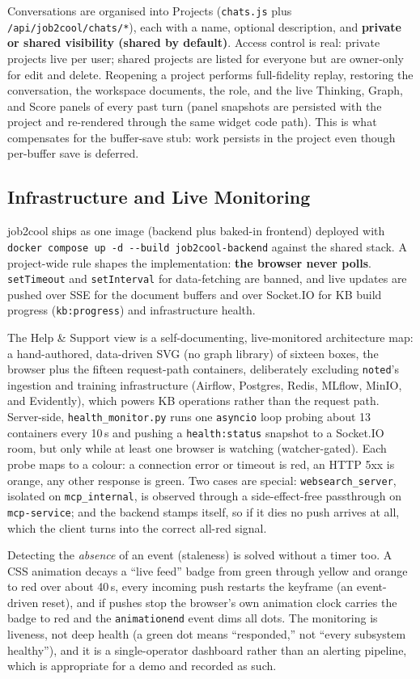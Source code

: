 Conversations are organised into Projects (\verb|chats.js| plus \verb|/api/job2cool/chats/*|),
each with a name, optional description, and \textbf{private or shared visibility (shared by
default)}. Access control is real: private projects live per user; shared projects are
listed for everyone but are owner-only for edit and delete. Reopening a project performs
full-fidelity replay, restoring the conversation, the workspace documents, the role, and
the live Thinking, Graph, and Score panels of every past turn (panel snapshots are
persisted with the project and re-rendered through the same widget code path). This is what
compensates for the buffer-save stub: work persists in the project even though per-buffer
save is deferred.

\subsection{Infrastructure and Live Monitoring}
\label{sec:infra}

job2cool ships as one image (backend plus baked-in frontend) deployed with
\texttt{docker compose up -d -{}-build job2cool-backend} against the shared stack. A
project-wide rule shapes the implementation: \textbf{the browser never polls}.
\verb|setTimeout| and \verb|setInterval| for data-fetching are banned, and live updates are
pushed over SSE for the document buffers and over Socket.IO for KB build progress
(\verb|kb:progress|) and infrastructure health.

The Help \& Support view is a self-documenting, live-monitored architecture map: a
hand-authored, data-driven SVG (no graph library) of sixteen boxes, the browser plus the
fifteen request-path containers, deliberately excluding \verb|noted|'s ingestion and
training infrastructure (Airflow, Postgres, Redis, MLflow, MinIO, and Evidently), which
powers KB operations rather than the request path. Server-side, \verb|health_monitor.py|
runs one \verb|asyncio| loop probing about 13 containers every 10\,s and pushing a
\verb|health:status| snapshot to a Socket.IO room, but only while at least one browser is
watching (watcher-gated). Each probe maps to a colour: a connection error or timeout is
red, an HTTP 5xx is orange, any other response is green. Two cases are special:
\verb|websearch_server|, isolated on \verb|mcp_internal|, is observed through a
side-effect-free passthrough on \verb|mcp-service|; and the backend stamps itself, so if it
dies no push arrives at all, which the client turns into the correct all-red signal.

Detecting the \emph{absence} of an event (staleness) is solved without a timer too. A CSS
animation decays a ``live feed'' badge from green through yellow and orange to red over
about 40\,s, every incoming push restarts the keyframe (an event-driven reset), and if
pushes stop the browser's own animation clock carries the badge to red and the
\verb|animationend| event dims all dots. The monitoring is liveness, not deep health (a
green dot means ``responded,'' not ``every subsystem healthy''), and it is a single-operator
dashboard rather than an alerting pipeline, which is appropriate for a demo and recorded as
such.
